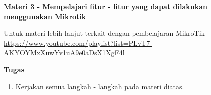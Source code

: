 \documentclass{article}
\begin{document}
    \begin{flushleft}
        \textbf{Materi 3 - Mempelajari fitur - fitur yang dapat dilakukan menggunakan Mikrotik}
        \newline

        Untuk materi lebih lanjut terkait dengan pembelajaran MikroTik
        \small\url{https://www.youtube.com/playlist?list=PLvT7-AKYOYMxXuwYv1uA9e0aDsX1XgF4l}
    \end{flushleft}

    \newpage
    \begin{flushleft}
     	\textbf{Tugas}
        \newline
        
		\begin{enumerate}
             \item Kerjakan semua langkah - langkah pada materi diatas.
        \end{enumerate}
     \end{flushleft}

 
\end{document}
